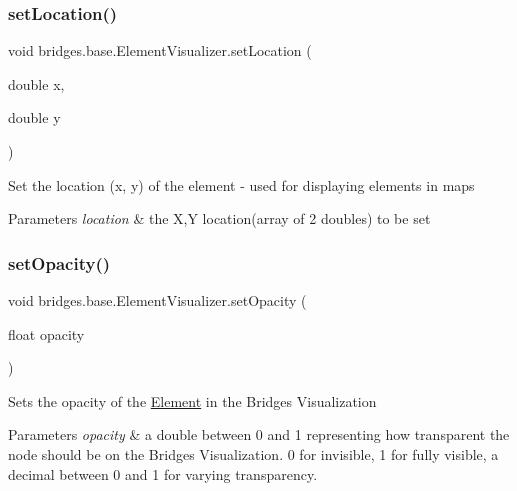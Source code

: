 \subsubsection{\texorpdfstring{set\+Location()}{setLocation()}}
{\footnotesize\ttfamily void bridges.\+base.\+Element\+Visualizer.\+set\+Location (\begin{DoxyParamCaption}\item[{double}]{x,  }\item[{double}]{y }\end{DoxyParamCaption})}

Set the location (x, y) of the element -\/ used for displaying elements in maps


\begin{DoxyParams}{Parameters}
{\em location} & the X,Y location(array of 2 doubles) to be set \\
\hline
\end{DoxyParams}
\mbox{\label{classbridges_1_1base_1_1_element_visualizer_a932f62eb1bd0c92da265a7f903dd0790}} 
\subsubsection{\texorpdfstring{set\+Opacity()}{setOpacity()}}
{\footnotesize\ttfamily void bridges.\+base.\+Element\+Visualizer.\+set\+Opacity (\begin{DoxyParamCaption}\item[{float}]{opacity }\end{DoxyParamCaption})}

Sets the opacity of the \mbox{\hyperlink{classbridges_1_1base_1_1_element}{Element}} in the Bridges Visualization


\begin{DoxyParams}{Parameters}
{\em opacity} & a double between 0 and 1 representing how transparent the node should be on the Bridges Visualization. 0 for invisible, 1 for fully visible, a decimal between 0 and 1 for varying transparency. \\
\hline
\end{DoxyParams}
\mbox{\label{classbridges_1_1base_1_1_element_visualizer_ac3bad991904c8ad23e5233b341381d93}} 
